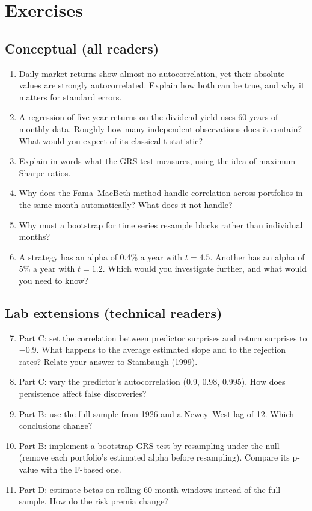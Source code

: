 \section*{Exercises}

\subsection*{Conceptual (all readers)}

\begin{enumerate}
  \item Daily market returns show almost no autocorrelation, yet their absolute values are strongly autocorrelated. Explain how both can be true, and why it matters for standard errors.
  \item A regression of five-year returns on the dividend yield uses 60 years of monthly data. Roughly how many independent observations does it contain? What would you expect of its classical t-statistic?
  \item Explain in words what the GRS test measures, using the idea of maximum Sharpe ratios.
  \item Why does the Fama--MacBeth method handle correlation across portfolios in the same month automatically? What does it not handle?
  \item Why must a bootstrap for time series resample blocks rather than individual months?
  \item A strategy has an alpha of 0.4\% a year with $t = 4.5$. Another has an alpha of 5\% a year with $t = 1.2$. Which would you investigate further, and what would you need to know?
\end{enumerate}

\subsection*{Lab extensions (technical readers)}

\begin{enumerate}
  \setcounter{enumi}{6}
  \item Part C: set the correlation between predictor surprises and return surprises to $-0.9$. What happens to the average estimated slope and to the rejection rates? Relate your answer to Stambaugh (1999).
  \item Part C: vary the predictor's autocorrelation (0.9, 0.98, 0.995). How does persistence affect false discoveries?
  \item Part B: use the full sample from 1926 and a Newey--West lag of 12. Which conclusions change?
  \item Part B: implement a bootstrap GRS test by resampling under the null (remove each portfolio's estimated alpha before resampling). Compare its p-value with the F-based one.
  \item Part D: estimate betas on rolling 60-month windows instead of the full sample. How do the risk premia change?
\end{enumerate}


